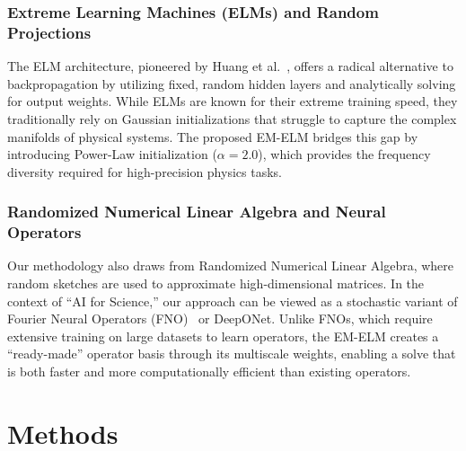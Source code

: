 \documentclass[final,12pt,3p,times,fleqn]{elsarticle}
\begin{document}
\subsubsection{Extreme Learning Machines (ELMs) and Random Projections}

The ELM architecture, pioneered by Huang et al.~\cite{huang2006extreme}, offers a radical alternative to backpropagation by utilizing fixed, random hidden layers and analytically solving for output weights. 
 While ELMs are known for their extreme training speed, they traditionally rely on Gaussian initializations that struggle to capture the complex manifolds of physical systems. The proposed EM-ELM bridges this gap by introducing Power-Law initialization ($\alpha=2.0$), which provides the frequency diversity required for high-precision physics tasks.

\subsubsection{Randomized Numerical Linear Algebra and Neural Operators}

Our methodology also draws from Randomized Numerical Linear Algebra, where random sketches are used to approximate high-dimensional matrices. In the context of ``AI for Science,'' our approach can be viewed as a stochastic variant of Fourier Neural Operators (FNO)~\cite{li2020fourier} or DeepONet. Unlike FNOs, which require extensive training on large datasets to learn operators, the EM-ELM creates a ``ready-made'' operator basis through its multiscale weights, enabling a solve that is both faster and more computationally efficient than existing operators.


\section{Methods}
\end{document}
